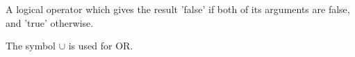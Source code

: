 A logical operator which gives the result 'false' if both of
its arguments are false, and 'true' otherwise.
\par
The symbol $ \cup $ is used for OR. 